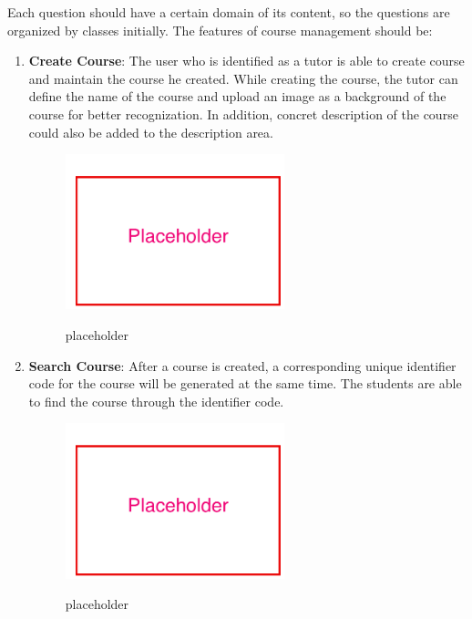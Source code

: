 Each question should have a certain domain of its content, so the questions are organized by classes initially. The features of course management should be:
\begin{enumerate}
\item
\textbf{Create Course}: The user who is identified as a tutor is able to create course and maintain the course he created. While creating the course, the tutor can define the name of the course and upload an image as a background of the course for better recognization. In addition, concret description of the course could also be added to the description area.

\begin{figure}[!htbp]
  \caption{placeholder}
  \centering
    \includegraphics[width=0.6\textwidth]{Figures/placeholder.png}
  \label{fig:placeholder}
\end{figure}


\item
\textbf{Search Course}: After a course is created, a corresponding unique identifier code for the course will be generated at the same time. The students are able to find the course through the identifier code.

\begin{figure}[!htbp]
  \caption{placeholder}
  \centering
    \includegraphics[width=0.6\textwidth]{Figures/placeholder.png}
  \label{fig:placeholder}
\end{figure}


\end{enumerate}
